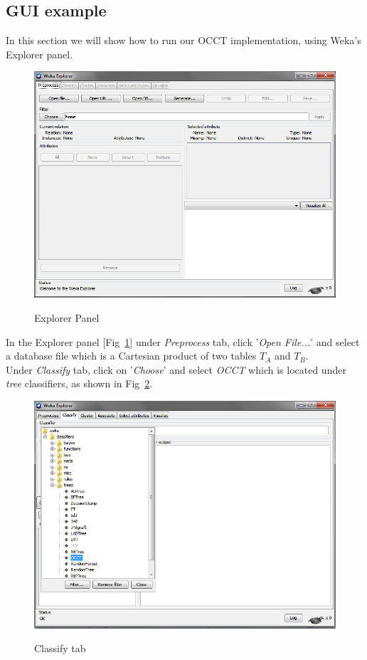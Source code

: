 \documentclass[a4paper,12pt]{article}
\newcommand{\newpar}{\smallskip\noindent} %
\begin{document}
\begin{spacing}{1.5}
\section{GUI example}
In this section we will show how to run our OCCT implementation, using Weka's Explorer panel.
\begin{figure}[!h]
  \centering
  \includegraphics[width=1\textwidth]{Figures/GUI/MainExplorer}\\
  \caption{Explorer Panel}
  \label{fig:wekaexplorer}
\end{figure}
\newpar
In the Explorer panel [Fig~\ref{fig:wekaexplorer}] under {\em Preprocess} tab, click '{\em Open File...}'
and select a database file which is a Cartesian product of two tables $T_{A}$ and $T_{B}$.\\
\clearpage
Under {\em Classify} tab, click on '{\em Choose}' and select {\em OCCT} which is located under {\em tree} classifiers,
as shown in Fig~\ref{fig:occtPre}.
\begin{figure}[!h]
  \centering
  \includegraphics[width=1\textwidth]{Figures/GUI/OCCTPre}\\
  \caption{Classify tab}
  \label{fig:occtPre}
\end{figure}\\



\end{spacing}
\end{document}
